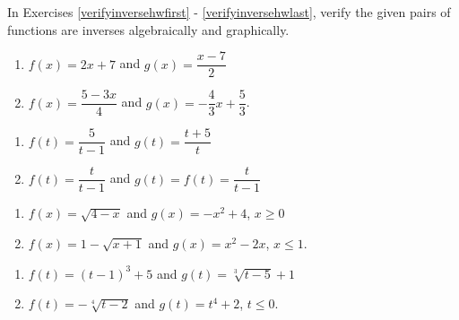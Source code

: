 \label{ExercisesforInverseFunctions}

In Exercises \ref{verifyinversehwfirst} - \ref{verifyinversehwlast}, verify the given pairs of functions are inverses algebraically and graphically.  

\begin{multicols}{2}
\begin{enumerate}

\item $f(x) = 2x+7$ and $g(x) = \dfrac{x-7}{2}$ \label{verifyinversehwfirst}
\item $f(x) = \dfrac{5-3x}{4}$ and $g(x) = -\dfrac{4}{3} x + \dfrac{5}{3}$.


\setcounter{HW}{\value{enumi}}
\end{enumerate}
\end{multicols}


\begin{multicols}{2}
\begin{enumerate}
\setcounter{enumi}{\value{HW}}

\item $f(t) = \dfrac{5}{t-1}$ and $g(t) = \dfrac{t+5}{t}$ 
\item \label{owninverseexample} $f(t)  = \dfrac{t}{t-1}$ and $g(t) = f(t) =  \dfrac{t}{t-1}$


\setcounter{HW}{\value{enumi}}
\end{enumerate}
\end{multicols}


\begin{multicols}{2}
\begin{enumerate}
\setcounter{enumi}{\value{HW}}

\item $f(x) = \sqrt{4-x}$ and $g(x) = -x^2+4$, $x \geq 0$
\item $f(x) = 1-\sqrt{x+1}$ and $g(x) = x^2-2x$, $x \leq 1$.

\setcounter{HW}{\value{enumi}}
\end{enumerate}
\end{multicols}

\begin{multicols}{2}
\begin{enumerate}
\setcounter{enumi}{\value{HW}}

\item $f(t) = (t-1)^3+5$ and $g(t) = \sqrt[3]{t-5}+1$
\item  $f(t) = -\sqrt[4]{t-2}$ and $g(t) = t^4+2$, $t \leq 0$.  \label{verifyinversehwlast}


\setcounter{HW}{\value{enumi}}
\end{enumerate}
\end{multicols}


